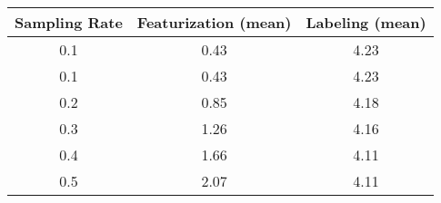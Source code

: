 \begin{tabular}{ccc}
\toprule
 Sampling Rate &  Featurization (mean) &  Labeling (mean) \\
\midrule
           0.1 &                  0.43 &             4.23 \\
           0.1 &                  0.43 &             4.23 \\
           0.2 &                  0.85 &             4.18 \\
           0.3 &                  1.26 &             4.16 \\
           0.4 &                  1.66 &             4.11 \\
           0.5 &                  2.07 &             4.11 \\
\bottomrule
\end{tabular}
